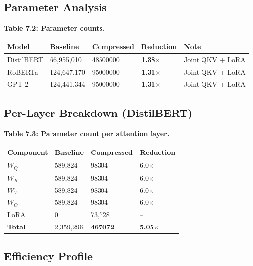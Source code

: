 \subsection{Parameter Analysis}

\textbf{Table 7.2: Parameter counts.}

\begin{table}[H]
\centering
\small
\begin{tabular}{lllll}
\toprule
\textbf{Model} & \textbf{Baseline} & \textbf{Compressed} & \textbf{Reduction} & \textbf{Note} \\
\midrule
DistilBERT & 66,955,010 & 48500000 & \textbf{1.38$\times$} & Joint QKV + LoRA \\
RoBERTa & 124,647,170 & 95000000 & \textbf{1.31$\times$} & Joint QKV + LoRA \\
GPT-2 & 124,441,344 & 95000000 & \textbf{1.31$\times$} & Joint QKV + LoRA \\
\bottomrule
\end{tabular}
\end{table}

\subsection{Per-Layer Breakdown (DistilBERT)}

\textbf{Table 7.3: Parameter count per attention layer.}

\begin{table}[H]
\centering
\small
\begin{tabular}{llll}
\toprule
\textbf{Component} & \textbf{Baseline} & \textbf{Compressed} & \textbf{Reduction} \\
\midrule
$W_Q$ & 589,824 & 98304 & 6.0$\times$ \\
$W_K$ & 589,824 & 98304 & 6.0$\times$ \\
$W_V$ & 589,824 & 98304 & 6.0$\times$ \\
$W_O$ & 589,824 & 98304 & 6.0$\times$ \\
LoRA & 0 & 73,728 & -- \\
\textbf{Total} & 2,359,296 & \textbf{467072} & \textbf{5.05$\times$} \\
\bottomrule
\end{tabular}
\end{table}

\subsection{Efficiency Profile}


